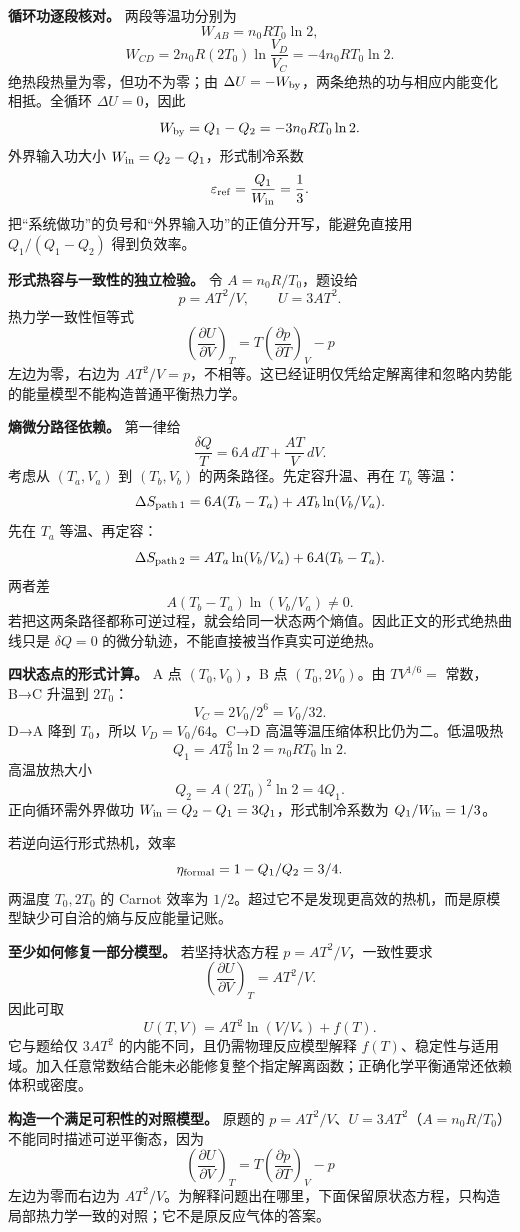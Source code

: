 \documentclass[12pt,a4paper,UTF8]{ctexart}
\begin{document}
\textbf{循环功逐段核对。} 两段等温功分别为 \[
W_{AB}=n_0RT_0\ln2,
\] \[
W_{CD}=2n_0R(2T_0)\ln\frac{V_D}{V_C}
=-4n_0RT_0\ln2.
\] 绝热段热量为零，但功不为零；由
\(\Delta U=-W_{\rm by}\)，两条绝热的功与相应内能变化相抵。全循环
\(\Delta U=0\)，因此 \[
W_{\rm by}=Q_1-Q_2
=-3n_0RT_0\ln2.
\] 外界输入功大小 \(W_{\rm in}=Q_2-Q_1\)，形式制冷系数 \[
\varepsilon_{\rm ref}
=\frac{Q_1}{W_{\rm in}}
=\frac13.
\] 把``系统做功''的负号和``外界输入功''的正值分开写，能避免直接用
\(Q_1/(Q_1-Q_2)\) 得到负效率。

\textbf{形式热容与一致性的独立检验。} 令 \(A=n_0R/T_0\)，题设给 \[
p=AT^2/V,\qquad U=3AT^2.
\] 热力学一致性恒等式 \[
\left(\frac{\partial U}{\partial V}\right)_T
=T\left(\frac{\partial p}{\partial T}\right)_V-p
\] 左边为零，右边为
\(AT^2/V=p\)，不相等。这已经证明仅凭给定解离律和忽略内势能的能量模型不能构造普通平衡热力学。

\textbf{熵微分路径依赖。} 第一律给 \[
\frac{\delta Q}{T}=6A\,dT+\frac{AT}{V}\,dV.
\] 考虑从 \((T_a,V_a)\) 到 \((T_b,V_b)\) 的两条路径。先定容升温、再在
\(T_b\) 等温： \[
\Delta S_{\rm path\,1}=6A(T_b-T_a)+AT_b\ln(V_b/V_a).
\] 先在 \(T_a\) 等温、再定容： \[
\Delta S_{\rm path\,2}=AT_a\ln(V_b/V_a)+6A(T_b-T_a).
\] 两者差 \[
A(T_b-T_a)\ln(V_b/V_a)\ne0.
\]
若把这两条路径都称可逆过程，就会给同一状态两个熵值。因此正文的形式绝热曲线只是
\(\delta Q=0\) 的微分轨迹，不能直接被当作真实可逆绝热。

\textbf{四状态点的形式计算。} A 点 \((T_0,V_0)\)，B 点
\((T_0,2V_0)\)。由 \(TV^{1/6}=\) 常数，B→C 升温到 \(2T_0\)： \[
V_C=2V_0/2^6=V_0/32.
\] D→A 降到 \(T_0\)，所以 \(V_D=V_0/64\)。C→D
高温等温压缩体积比仍为二。低温吸热 \[
Q_1=AT_0^2\ln2=n_0RT_0\ln2.
\] 高温放热大小 \[
Q_2=A(2T_0)^2\ln2=4Q_1.
\] 正向循环需外界做功 \(W_{\rm in}=Q_2-Q_1=3Q_1\)，形式制冷系数为
\(Q_1/W_{\rm in}=1/3\)。

若逆向运行形式热机，效率 \[
\eta_{\rm formal}=1-Q_1/Q_2=3/4.
\] 两温度 \(T_0,2T_0\) 的 Carnot 效率为
\(1/2\)。超过它不是发现更高效的热机，而是原模型缺少可自洽的熵与反应能量记账。

\textbf{至少如何修复一部分模型。} 若坚持状态方程
\(p=AT^2/V\)，一致性要求 \[
\left(\frac{\partial U}{\partial V}\right)_T=AT^2/V.
\] 因此可取 \[
U(T,V)=AT^2\ln(V/V_*)+f(T).
\] 它与题给仅 \(3AT^2\) 的内能不同，且仍需物理反应模型解释
\(f(T)\)、稳定性与适用域。加入任意常数结合能未必能修复整个指定解离函数；正确化学平衡通常还依赖体积或密度。

\textbf{构造一个满足可积性的对照模型。} 原题的
\(p=AT^2/V\)、\(U=3AT^2\)（\(A=n_0R/T_0\)）不能同时描述可逆平衡态，因为
\[
\left(\frac{\partial U}{\partial V}\right)_T
=T\left(\frac{\partial p}{\partial T}\right)_V-p
\] 左边为零而右边为
\(AT^2/V\)。为解释问题出在哪里，下面保留原状态方程，只构造局部热力学一致的对照；它不是原反应气体的答案。
\end{document}

